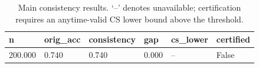 \begin{table}[t]
\centering
\begin{tabular}{llllll}
\toprule
n & orig_acc & consistency & gap & cs_lower & certified \\
\midrule
200.000 & 0.740 & 0.740 & 0.000 & -- & False \\
\bottomrule
\end{tabular}
\caption{Main consistency results. `--' denotes unavailable; certification requires an anytime-valid CS lower bound above the threshold.}
\end{table}
